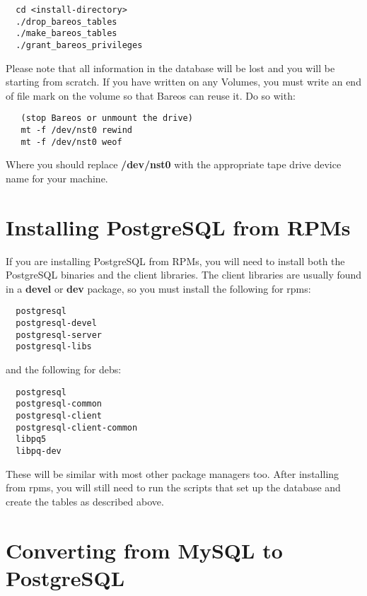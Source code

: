 \footnotesize
\begin{verbatim}
  cd <install-directory>
  ./drop_bareos_tables
  ./make_bareos_tables
  ./grant_bareos_privileges
\end{verbatim}
\normalsize

Please note that all information in the database will be lost and you will be
starting from scratch. If you have written on any Volumes, you must write an
end of file mark on the volume so that Bareos can reuse it. Do so with:

\footnotesize
\begin{verbatim}
   (stop Bareos or unmount the drive)
   mt -f /dev/nst0 rewind
   mt -f /dev/nst0 weof
\end{verbatim}
\normalsize

Where you should replace {\bf /dev/nst0} with the appropriate tape drive
device name for your machine.

\section{Installing PostgreSQL from RPMs}
If you are installing PostgreSQL from RPMs, you will need to install
both the PostgreSQL binaries and the client libraries.  The client
libraries are usually found in a {\bf devel} or {\bf dev} package, so you must
install the following for rpms:

\footnotesize
\begin{verbatim}
  postgresql
  postgresql-devel
  postgresql-server
  postgresql-libs
\end{verbatim}
\normalsize


and the following for debs:

\footnotesize
\begin{verbatim}
  postgresql
  postgresql-common
  postgresql-client
  postgresql-client-common
  libpq5
  libpq-dev
\end{verbatim}
\normalsize


These will be similar with most other package managers too.  After
installing from rpms, you will still need to run the scripts that set up
the database and create the tables as described above.


\section{Converting from MySQL to PostgreSQL}

